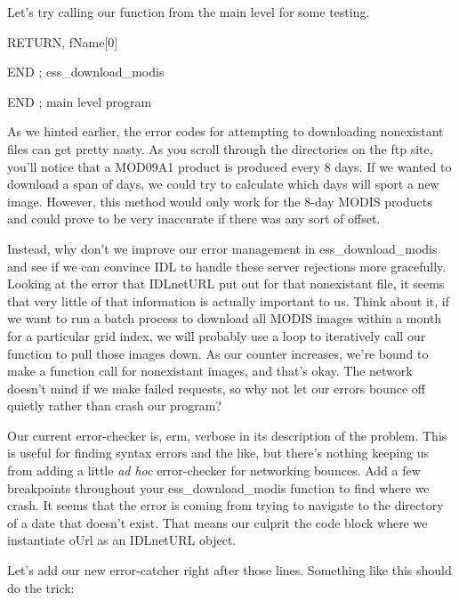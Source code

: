 \documentclass{book}
\newcommand{\codefill}{\centering$\longrightarrow$\hfill{\color{gray}\rule[0.1\baselineskip]{0.5\linewidth}{2pt}}\hfill$\longleftarrow$}
\newcounter{highlight}[page]
\newcommand{\tikzhighlightanchor}[1]{\ensuremath{\vcenter{\hbox{\tikz[remember picture, overlay]{\coordinate (#1 highlight \arabic{highlight});}}}}}
\newcommand{\bh}[0]{\stepcounter{highlight}\tikzhighlightanchor{begin}}
\newcommand{\eh}[0]{\tikzhighlightanchor{end}}
\theoremstyle{aside_style}
\begin{document}
Let's try calling our function from the main level for some testing.

\begin{idl}
RETURN, fName[0]

END ; ess_download_modis


END ; main level program
\end{idl}

As we hinted earlier, the error codes for attempting to downloading nonexistant files can get pretty nasty.
As you scroll through the directories on the ftp site, you'll notice that a MOD09A1 product is produced every 8 days.
If we wanted to download a span of days, we could try to calculate which days will sport a new image.
However, this method would only work for the 8-day MODIS products and could prove to be very inaccurate if there was any sort of offset.

Instead, why don't we improve our error management in ess\_download\_modis and see if we can convince IDL to handle these server rejections more gracefully.
Looking at the error that IDLnetURL put out for that nonexistant file, it seems that very little of that information is actually important to us. 
Think about it, if we want to run a batch process to download all MODIS images within a month for a particular grid index,
we will probably use a loop to iteratively call our function to pull those images down.
As our counter increases, we're bound to make a function call for nonexistant images, and that's okay.
The network doesn't mind if we make failed requests, so why not let our errors bounce off quietly rather than crash our program?

Our current error-checker is, erm, verbose in its description of the problem.
This is useful for finding syntax errors and the like, but there's nothing keeping us from adding a little \textit{ad hoc} 
error-checker for networking bounces.
Add a few breakpoints throughout your ess\_download\_modis function to find where we crash.
It seems that the error is coming from trying to navigate to the directory of a date that doesn't exist.
That means our culprit the code block where we instantiate oUrl as an IDLnetURL object.

Let's add our new error-catcher right after those lines.
Something like this should do the trick:
\end{document}

